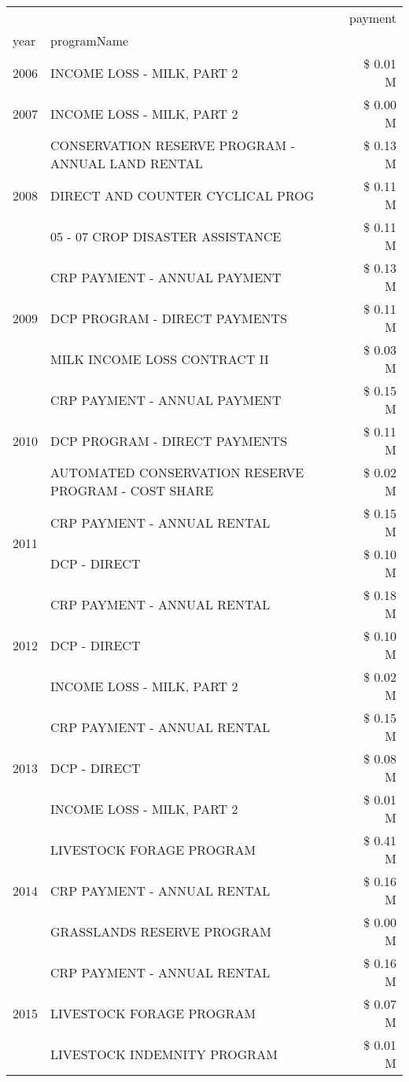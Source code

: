 \begin{tabular}{llr}
\toprule
 &  & payment \\
year & programName &  \\
\midrule
2006 & INCOME LOSS - MILK, PART 2 & \$ 0.01 M \\
\cline{1-3}
2007 & INCOME LOSS - MILK, PART 2 & \$ 0.00 M \\
\cline{1-3}
\multirow[t]{3}{*}{2008} & CONSERVATION RESERVE PROGRAM - ANNUAL LAND RENTAL & \$ 0.13 M \\
 & DIRECT AND COUNTER CYCLICAL PROG & \$ 0.11 M \\
 & 05 - 07 CROP DISASTER ASSISTANCE & \$ 0.11 M \\
\cline{1-3}
\multirow[t]{3}{*}{2009} & CRP PAYMENT - ANNUAL PAYMENT & \$ 0.13 M \\
 & DCP PROGRAM - DIRECT PAYMENTS & \$ 0.11 M \\
 & MILK INCOME LOSS CONTRACT II & \$ 0.03 M \\
\cline{1-3}
\multirow[t]{3}{*}{2010} & CRP PAYMENT - ANNUAL PAYMENT & \$ 0.15 M \\
 & DCP PROGRAM - DIRECT PAYMENTS & \$ 0.11 M \\
 & AUTOMATED CONSERVATION RESERVE PROGRAM - COST SHARE & \$ 0.02 M \\
\cline{1-3}
\multirow[t]{2}{*}{2011} & CRP PAYMENT - ANNUAL RENTAL & \$ 0.15 M \\
 & DCP - DIRECT & \$ 0.10 M \\
\cline{1-3}
\multirow[t]{3}{*}{2012} & CRP PAYMENT - ANNUAL RENTAL & \$ 0.18 M \\
 & DCP - DIRECT & \$ 0.10 M \\
 & INCOME LOSS - MILK, PART 2 & \$ 0.02 M \\
\cline{1-3}
\multirow[t]{3}{*}{2013} & CRP PAYMENT - ANNUAL RENTAL & \$ 0.15 M \\
 & DCP - DIRECT & \$ 0.08 M \\
 & INCOME LOSS - MILK, PART 2 & \$ 0.01 M \\
\cline{1-3}
\multirow[t]{3}{*}{2014} & LIVESTOCK FORAGE PROGRAM & \$ 0.41 M \\
 & CRP PAYMENT - ANNUAL RENTAL & \$ 0.16 M \\
 & GRASSLANDS RESERVE PROGRAM & \$ 0.00 M \\
\cline{1-3}
\multirow[t]{3}{*}{2015} & CRP PAYMENT - ANNUAL RENTAL & \$ 0.16 M \\
 & LIVESTOCK FORAGE PROGRAM & \$ 0.07 M \\
 & LIVESTOCK INDEMNITY PROGRAM & \$ 0.01 M \\

\end{tabular}
